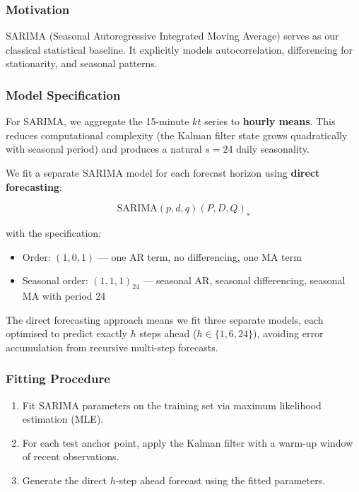 \documentclass[11pt,a4paper]{article}
\begin{document}
\subsubsection{Motivation}

SARIMA (Seasonal Autoregressive Integrated Moving Average) serves as our classical statistical baseline. It explicitly models autocorrelation, differencing for stationarity, and seasonal patterns.

\subsubsection{Model Specification}

For SARIMA, we aggregate the 15-minute $kt$ series to \textbf{hourly means}. This reduces computational complexity (the Kalman filter state grows quadratically with seasonal period) and produces a natural $s = 24$ daily seasonality.

We fit a separate SARIMA model for each forecast horizon using \textbf{direct forecasting}:

\begin{equation}
    \text{SARIMA}(p, d, q)(P, D, Q)_s
\end{equation}

with the specification:
\begin{itemize}[noitemsep]
    \item Order: $(1, 0, 1)$ --- one AR term, no differencing, one MA term
    \item Seasonal order: $(1, 1, 1)_{24}$ --- seasonal AR, seasonal differencing, seasonal MA with period 24
\end{itemize}

The direct forecasting approach means we fit three separate models, each optimised to predict exactly $h$ steps ahead ($h \in \{1, 6, 24\}$), avoiding error accumulation from recursive multi-step forecasts.

\subsubsection{Fitting Procedure}

\begin{enumerate}[noitemsep]
    \item Fit SARIMA parameters on the training set via maximum likelihood estimation (MLE).
    \item For each test anchor point, apply the Kalman filter with a warm-up window of recent observations.
    \item Generate the direct $h$-step ahead forecast using the fitted parameters.
\end{enumerate}
\end{document}
